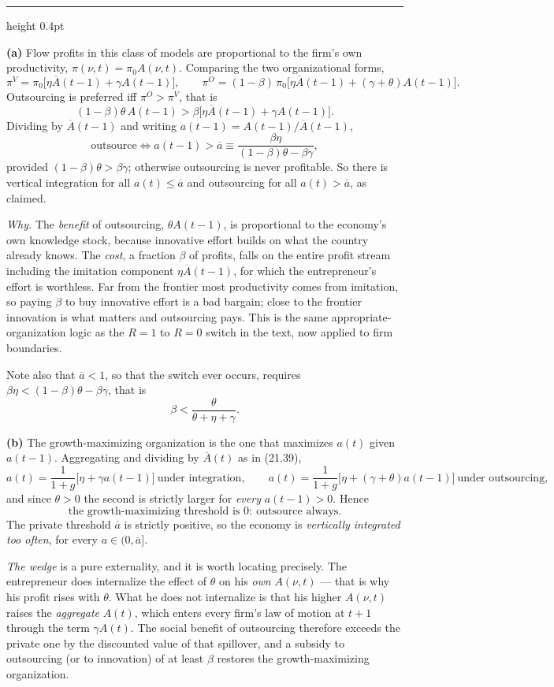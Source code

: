 \documentclass[11pt,letterpaper,reqno]{amsart}
\makeatletter
\newcommand{\ol}[1]{\overline{#1}}
\newcommand{\as@head}[3]{%
  \par\addvspace{1.6ex}\penalty-200\relax
  \phantomsection
  \addcontentsline{toc}{subsection}{#1 #2\texorpdfstring{\ifx\relax#3\relax\else\quad #3\fi}{}}%
  {\color{RuleGrey}\hrule height 0.4pt}%
  \nobreak\vspace{0.8ex}\nobreak
  \noindent{\bfseries #1 #2}%
  \ifx\relax#3\relax\else\quad{\bfseries\itshape #3}\fi
  \par\nobreak\vspace{0.4ex}\nobreak
  \as@beginstatement
}
\newcommand{\as@beginstatement}{\begingroup\itshape\ignorespaces}
\newenvironment{aex}[2]{\as@head{Exercise}{#1}{#2}}{\par\addvspace{1.2ex}}
\newcommand{\bk}[1]{\textup{\textsc{#1}}}
\renewcommand{\as@beginstatement}{\ignorespaces}
\makeatother
\begin{document}
\begin{aex}{21.7}{}
\textbf{(a)}  Flow profits in this class of models are proportional to the firm's own
productivity, $\pi(\nu,t)=\pi_0A(\nu,t)$.  Comparing the two organizational forms,
\[
\pi^{V}=\pi_0\bigl[\eta\ol A(t-1)+\gamma A(t-1)\bigr],
\qquad
\pi^{O}=(1-\beta)\,\pi_0\bigl[\eta\ol A(t-1)+(\gamma+\theta)A(t-1)\bigr] .
\]
Outsourcing is preferred iff $\pi^O>\pi^V$, that is
\[
(1-\beta)\theta\,A(t-1)>\beta\bigl[\eta\ol A(t-1)+\gamma A(t-1)\bigr] .
\]
Dividing by $\ol A(t-1)$ and writing $a(t-1)=A(t-1)/\ol A(t-1)$,
\[
\boxed{\ \text{outsource}\iff a(t-1)>\ol a\equiv
\frac{\beta\eta}{(1-\beta)\theta-\beta\gamma} , \ }
\]
provided $(1-\beta)\theta>\beta\gamma$; otherwise outsourcing is never profitable.  So there is
vertical integration for all $a(t)\le\ol a$ and outsourcing for all $a(t)>\ol a$, as claimed.

\emph{Why.}  The \emph{benefit} of outsourcing, $\theta A(t-1)$, is proportional to the economy's
own knowledge stock, because innovative effort builds on what the country already knows.  The
\emph{cost}, a fraction $\beta$ of profits, falls on the entire profit stream including the
imitation component $\eta\ol A(t-1)$, for which the entrepreneur's effort is worthless.  Far from
the frontier most productivity comes from imitation, so paying $\beta$ to buy innovative effort
is a bad bargain; close to the frontier innovation is what matters and outsourcing pays.  This is
the same appropriate-organization logic as the $R=1$ to $R=0$ switch in the text, now applied to
firm boundaries.

Note also that $\ol a<1$, so that the switch ever occurs, requires
$\beta\eta<(1-\beta)\theta-\beta\gamma$, that is
\[
\beta<\frac{\theta}{\theta+\eta+\gamma} .
\]

\textbf{(b)}  The growth-maximizing organization is the one that maximizes $a(t)$ given
$a(t-1)$.  Aggregating and dividing by $\ol A(t)$ as in \bk{(21.39)},
\[
a(t)=\frac{1}{1+g}\bigl[\eta+\gamma a(t-1)\bigr]\ \text{under integration},
\qquad
a(t)=\frac{1}{1+g}\bigl[\eta+(\gamma+\theta)a(t-1)\bigr]\ \text{under outsourcing},
\]
and since $\theta>0$ the second is strictly larger for \emph{every} $a(t-1)>0$.  Hence
\[
\boxed{\ \text{the growth-maximizing threshold is }0:\ \text{outsource always.} \ }
\]
The private threshold $\ol a$ is strictly positive, so the economy is \emph{vertically integrated
too often}, for every $a\in(0,\ol a]$.

\emph{The wedge} is a pure externality, and it is worth locating precisely.  The entrepreneur
does internalize the effect of $\theta$ on his \emph{own} $A(\nu,t)$ --- that is why his profit
rises with $\theta$.  What he does not internalize is that his higher $A(\nu,t)$ raises the
\emph{aggregate} $A(t)$, which enters every firm's law of motion at $t+1$ through the term
$\gamma A(t)$.  The social benefit of outsourcing therefore exceeds the private one by the
discounted value of that spillover, and a subsidy to outsourcing (or to innovation) of at least
$\beta$ restores the growth-maximizing organization.


\end{aex}
\end{document}
